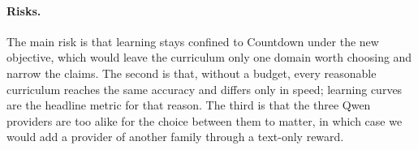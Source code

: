 \paragraph{Risks.} The main risk is that learning stays confined to Countdown under the new
objective, which would leave the curriculum only one domain worth choosing and narrow the
claims. The second is that, without a budget, every reasonable curriculum reaches the same
accuracy and differs only in speed; learning curves are the headline metric for that
reason. The third is that the three Qwen providers are too alike for the choice between
them to matter, in which case we would add a provider of another family through a
text-only reward.
